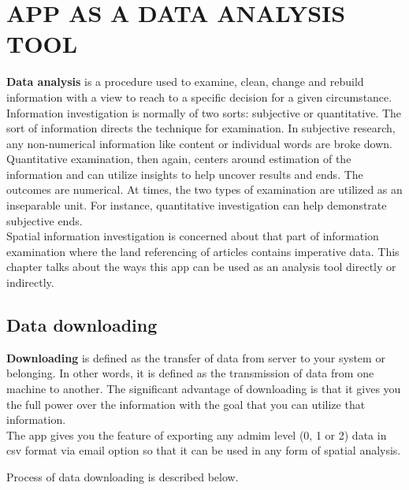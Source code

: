 \chapter{APP AS A DATA ANALYSIS TOOL}
\label{chap:analysis_tool}

\textbf{Data analysis} is a procedure used to examine, clean, change and rebuild information with a view to reach to a specific decision for a given circumstance. Information investigation is normally of two sorts: subjective or quantitative. The sort of information directs the technique for examination. In subjective research, any non-numerical information like content or individual words are broke down. Quantitative examination, then again, centers around estimation of the information and can utilize insights to help uncover results and ends. The outcomes are numerical. At times, the two types of examination are utilized as an inseparable unit. For instance, quantitative investigation can help demonstrate subjective ends. \\

Spatial information investigation is concerned about that part of information examination where the land referencing of articles contains imperative data. This chapter talks about the ways this app can be used as an analysis tool directly or indirectly. \\

\section{Data downloading}

\textbf{Downloading} is defined as the transfer of data from server to your system or belonging. In other words, it is defined as the transmission of data from one machine to another. The significant advantage of downloading is that it gives you the full power over the information with the goal that you can utilize that information. \\

The app gives you the feature of exporting any admim level (0, 1 or 2) data in \gls{csv} format via email option so that it can be used in any form of spatial analysis.

\newpage

Process of data downloading is described below.

